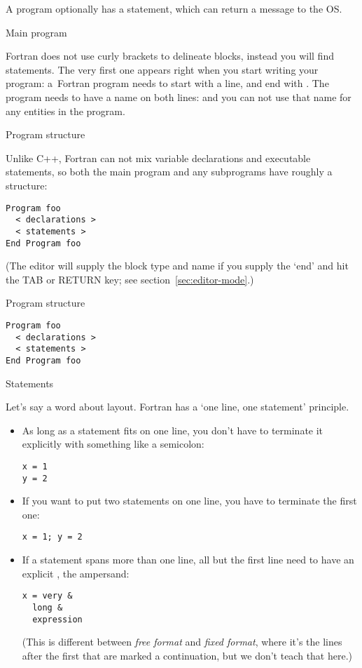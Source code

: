 A program optionally has a  statement, which can
return a message to the \ac{OS}.
%

 {Main program}

Fortran does not use curly brackets to delineate blocks, instead you
will find  statements. The very first one appears
right when you start writing your program:
a~Fortran program needs to start with a  line, and end with
. The program needs to have a name on both lines:
%
%
and you can not use that name for any entities in the program.

 {Program structure}

Unlike C++, Fortran can not mix variable declarations and executable
statements, so both the main program and any subprograms have roughly
a
structure:
\begin{verbatim}
Program foo
  < declarations >
  < statements >
End Program foo
\end{verbatim}
(The  editor will supply the block type and name if
you supply the `end' and hit the TAB or RETURN key; see
section~\ref{sec:editor-mode}.)

\begin{slide}{Program structure}
  \label{sl:programf}
\begin{verbatim}
Program foo
  < declarations >
  < statements >
End Program foo
\end{verbatim}
\end{slide}

 {Statements}

Let's say a word about layout. Fortran has a `one line, one statement'
principle.
\begin{itemize}
\item As long as a statement fits on one line, you don't have to
  terminate it explicitly with something like a semicolon:
\begin{verbatim}
x = 1
y = 2
\end{verbatim}
\item If you want to put two statements on one line, you have to
  terminate the first one:
\begin{verbatim}
x = 1; y = 2
\end{verbatim}
\item If a statement spans more than one line, all but the first line
  need to have an explicit , the ampersand:
\begin{verbatim}
x = very &
  long &
  expression
\end{verbatim}
(This is different between
\emph{free format}
and \emph{fixed format},
where it's the lines after the
first that are marked a continuation, but we don't teach that here.)
\end{itemize}

